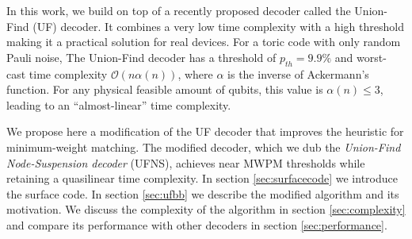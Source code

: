 In this work, we build on top of a recently proposed decoder called the Union-Find (UF) decoder. It combines a very low time complexity with a high threshold \cite{delfosse2017linear, delfosse2017almost} making it a practical solution for real devices. 
For a toric code with only random Pauli noise, The Union-Find decoder has a threshold of $p_{th} = 9.9\%$ and worst-cast time complexity $\mathcal{O}(n\alpha(n))$, where $\alpha$ is the inverse of Ackermann's function. For any physical feasible amount of qubits, this value is $\alpha(n) \leq 3$, leading to an ``almost-linear'' time complexity.

We propose here a modification of the UF decoder that improves the heuristic for minimum-weight matching. The modified decoder, which we dub the \emph{Union-Find Node-Suspension decoder} (UFNS), achieves near MWPM thresholds while retaining a quasilinear time complexity. In section \ref{sec:surfacecode} we introduce the surface code. In section \ref{sec:ufbb} we describe the modified algorithm and its motivation. We discuss the complexity of the algorithm in section \ref{sec:complexity} and compare its performance with other decoders in section \ref{sec:performance}.  